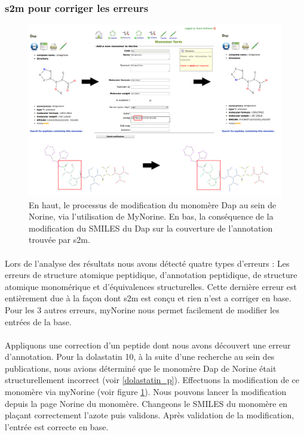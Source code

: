 \documentclass[12pt,french,twoside]{report}
\begin{document}
\subsubsection{s2m pour corriger les erreurs}

\begin{figure}[h!]
  \begin{center}
    \includegraphics[width=450px]{Figures/contributions/dap_modif.png}
    \caption{\label{dap_modif}En haut, le processus de modification du monomère Dap au sein de Norine, via l'utilisation de MyNorine.
    En bas, la conséquence de la modification du SMILES du Dap sur la couverture de l'annotation trouvée par s2m.}
  \end{center}
\end{figure}

\paragraph{}Lors de l'analyse des résultats nous avons détecté quatre types d'erreurs : Les erreurs de structure atomique peptidique, d'annotation peptidique, de structure atomique monomérique et d'équivalences structurelles.
Cette dernière erreur est entièrement due à la façon dont s2m est conçu et rien n'est a corriger en base.
Pour les 3 autres erreurs, myNorine nous permet facilement de modifier les entrées de la base.

\paragraph{}Appliquons une correction d'un peptide dont nous avons découvert une erreur d'annotation.
Pour la dolastatin 10, à la suite d'une recherche au sein des publications, nous avions déterminé que le monomère Dap de Norine était structurellement incorrect (voir \ref{dolastatin_p}).
Effectuons la modification de ce monomère via myNorine (voir figure \ref{dap_modif}).
Nous pouvons lancer la modification depuis la page Norine du monomère.
Changeons le SMILES du monomère en plaçant correctement l'azote puis validons.
Après validation de la modification, l'entrée est correcte en base.
\end{document}
